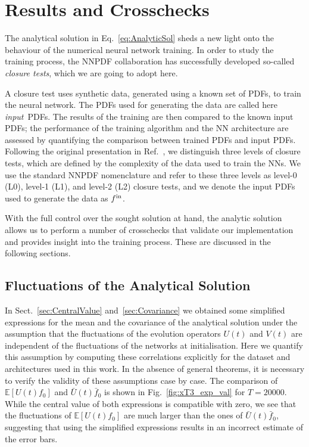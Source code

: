 \newpage
\section{Results and Crosschecks}

The analytical solution in Eq.~\eqref{eq:AnalyticSol} sheds a new light onto the
behaviour of the numerical neural network training. In order to study the
training process, the NNPDF collaboration has successfully developed so-called
{\em closure tests}, which we are going to adopt here. 

A closure test uses synthetic data, generated using a known set of PDFs, to
train the neural network. The PDFs used for generating the data are called here
{\em input}\ PDFs. The results of the training are then compared to the known
input PDFs; the performance of the training algorithm and the NN architecture
are assessed by quantifying the comparison between trained PDFs and input PDFs.
Following the original presentation in Ref.~\cite{NNPDF:2014otw}, we distinguish
three levels of closure tests, which are defined by the complexity of the data
used to train the NNs. We use the standard NNPDF nomenclature and refer to these
three levels as level-0 (L0), level-1 (L1), and level-2 (L2) closure tests, and
we denote the input PDFs used to generate the data as $f^{\rm in}$.

With the full control over the sought solution at hand, the analytic solution
allows us to perform a number of crosschecks that validate our implementation
and provides insight into the training process. These are discussed in the
following sections.

\subsection{Fluctuations of the Analytical Solution}
\label{sec:CheckCovariance}

In Sect.~\ref{sec:CentralValue} and~\ref{sec:Covariance} we obtained some
simplified expressions for the mean and the covariance of the analytical
solution under the assumption that the fluctuations of the evolution operators
$U(t)$ and $V(t)$ are independent of the fluctuations of the networks at
initialisation. Here we quantify this assumption by computing these correlations
explicitly for the dataset and architectures used in this work. In the absence
of general theorems, it is necessary to verify the validity of these assumptions
case by case. The comparison of $\mathbb{E}\left[U(t) f_{0}\right]$ and
$\bar{U}(t) \bar{f}_{0}$ is shown in Fig.~\ref{fig:xT3_exp_val} for $T=20000$.
While the central value of both expressions is compatible with zero, we see that
the fluctuations of $\mathbb{E}\left[U(t) f_{0}\right]$ are much larger than the
ones of $\bar{U}(t) \bar{f}_{0}$, suggesting that using the simplified
expressions results in an incorrect estimate of the error bars. 

